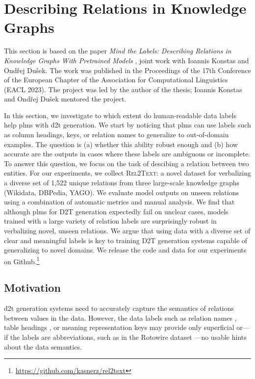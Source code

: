 \section{Describing Relations in Knowledge Graphs}
\label{sec:rel2text}
\begin{refbox}
    This section is based on the paper \emph{Mind the Labels: Describing Relations in Knowledge Graphs With Pretrained Models} \cite{kasnerMindLabelsDescribing2022}, joint work with Ioannis Konstas and Ondřej Dušek. The work was published in the Proceedings of the 17th Conference of the European Chapter of the Association for Computational Linguistics (EACL 2023). The project was led by the author of the thesis; Ioannis Konstas and Ondřej Dušek mentored the project.
\end{refbox}
In this section, we investigate to which extent do human-readable data labels help \acp{plm} with \ac{d2t} generation. We start by noticing that \acp{plm} can use labels such as column headings, keys, or relation names to generalize to out-of-domain examples. The question is (a) whether this ability robust enough and (b) how accurate are the outputs in cases where these labels are ambiguous or incomplete. To answer this question, we focus on the task of descibing a relation between two entities. For our experiments, we collect \textsc{Rel2Text}: a novel dataset for verbalizing a diverse set of 1,522 unique relations from three large-scale knowledge graphs (Wikidata, DBPedia, YAGO). We evaluate model outputs on unseen relations using a combination of automatic metrics and manual analysis. We find that although \acp{plm} for D2T generation expectedly fail on unclear cases, models trained with a large variety of relation labels are surprisingly robust in verbalizing novel, unseen relations. We argue that using data with a diverse set of clear and meaningful labels is key to training D2T generation systems capable of generalizing to novel domains. We release the code and data for our experiments on Github.\footnote{\url{https://github.com/kasnerz/rel2text}}


% 

\subsection{Motivation}
\ac{d2t} generation systems need to accurately capture the semantics of relations between values in the data. However, the data labels such as relation names \cite{farber2018linked,haller2022analysis}, table headings \cite{parikhToTToControlledTableToText2020}, or meaning representation keys \cite{dusekEvaluatingStateoftheartEndtoEnd2020} may provide only superficial or---if the labels are abbreviations, such as in the Rotowire dataset \cite{wiseman2017challenges}---no usable hints about the data semantics.


